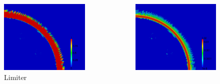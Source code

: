 \documentclass[8pt,xcolor=svgnames]{beamer}
\begin{document}
\begin{frame}
\begin{columns}
\begin{column}{0.3\textwidth}
\begin{figure}[t]
\begin{center}
\includegraphics[height=0.9\textwidth]{figs/Noh/Q2l-7-limiter.png}
\\Limiter
\end{center}
\end{figure}
\end{column}
\begin{column}{0.3\textwidth}
\begin{figure}[t]
\begin{center}
\includegraphics[height=0.9\textwidth]{figs/Noh/Q2l-7-viscosity.png}

\end{center}
\end{figure}
\end{column}
\end{columns}
\end{frame}
\end{document}
